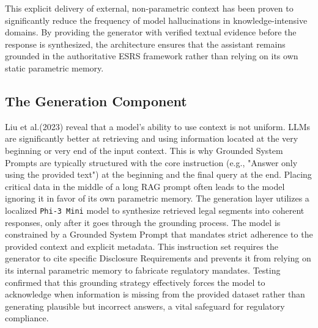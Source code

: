 \documentclass[12pt]{article}
\begin{document}
This explicit delivery of external, non-parametric context has been proven to significantly reduce the frequency of model hallucinations in knowledge-intensive domains. By providing the generator with verified textual evidence before the response is synthesized, the architecture ensures that the assistant remains grounded in the authoritative ESRS framework rather than relying on its own static parametric memory.


\subsection{The Generation Component}
Liu et al.(2023) \cite{liu2023lostmiddlelanguagemodels} reveal that a model's ability to use context is not uniform. LLMs are significantly better at retrieving and using information located at the very beginning or very end of the input context. This is why Grounded System Prompts are typically structured with the core instruction (e.g., "Answer only using the provided text") at the beginning and the final query at the end. Placing critical data in the middle of a long RAG prompt often leads to the model ignoring it in favor of its own parametric memory. The generation layer utilizes a localized \texttt{Phi-3 Mini} model to synthesize retrieved legal segments into coherent responses, only after it goes through the grounding process. The model is constrained by a Grounded System Prompt that mandates strict adherence to the provided context and explicit metadata. This instruction set requires the generator to cite specific Disclosure Requirements and prevents it from relying on its internal parametric memory to fabricate regulatory mandates. Testing confirmed that this grounding strategy effectively forces the model to acknowledge when information is missing from the provided dataset rather than generating plausible but incorrect answers, a vital safeguard for regulatory compliance.
\end{document}
